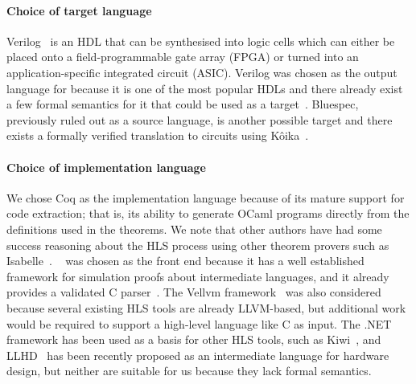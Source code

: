 \paragraph{Choice of target language}
Verilog~\cite{06_ieee_stand_veril_hardw_descr_languag} is an HDL that can be
synthesised into logic cells which can either be placed onto a
field-programmable gate array (FPGA) or turned into an application-specific
integrated circuit (ASIC).  Verilog was chosen as the output language for
\vericert{} because it is one of the most popular HDLs and there already exist a
few formal semantics for it that could be used as a
target~\cite{lööw19_verif_compil_verif_proces, meredith10_veril}.  Bluespec,
previously ruled out as a source language, is another possible target and there
exists a formally verified translation to circuits using
K\^{o}ika~\cite{bourgeat20_essen_blues}. %


\paragraph{Choice of implementation language}
We chose Coq as the implementation language because of its mature support for
code extraction; that is, its ability to generate OCaml programs directly from
the definitions used in the theorems.  We note that other authors have had some
success reasoning about the HLS process using other theorem provers such as
Isabelle~\cite{ellis08}.  \compcert{}~\cite{leroy09_formal_verif_realis_compil}
was chosen as the front end because it has a well established framework for
simulation proofs about intermediate languages, and it already provides a
validated C parser~\cite{jourdan12_valid_lr_parser}.  The Vellvm
framework~\cite{zhao12_formal_llvm_inter_repres_verif_progr_trans} was also
considered because several existing HLS tools are already LLVM-based, but
additional work would be required to support a high-level language like C as
input.  The .NET framework has been used as a basis for other HLS tools, such as
Kiwi~\cite{kiwi}, and LLHD~\cite{schuiki20_llhd} has been recently proposed as
an intermediate language for hardware design, but neither are suitable for us
because they lack formal semantics.

